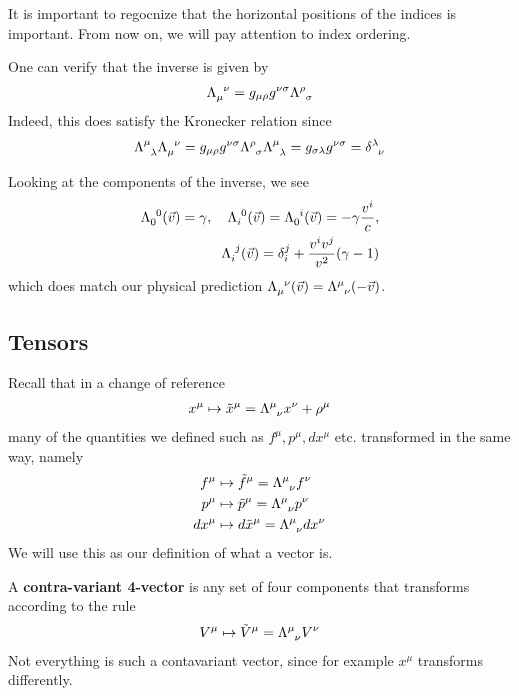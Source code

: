 It is important to regocnize that the horizontal positions of the indices is important.
From now on, we will pay attention to index ordering.

One can verify that the inverse is given by
\begin{align*}
  \tensor{\Lambda}{_{\mu}^{\nu}}
  = 
  g_{\mu \rho}g^{\nu \sigma} \tensor{\Lambda}{^{\rho}_{\sigma}}
\end{align*}
Indeed, this does satisfy the Kronecker relation since
\begin{align*}
  \tensor{\Lambda}{^{\mu}_{\lambda}}
  \tensor{\Lambda}{_{\mu}^{\nu}}
  = 
  g_{\mu \rho}g^{\nu \sigma} 
  \tensor{\Lambda}{^{\rho}_{\sigma}}
  \tensor{\Lambda}{^{\mu}_{\lambda}}
  = 
  g_{\sigma \lambda} g^{\nu \sigma} = 
  \tensor{\delta}{^{\lambda}_{\nu}}
\end{align*}

Looking at the components of the inverse, we see
\begin{align*}
  \tensor{\Lambda}{_0^0}
  (\vec{v}) = \gamma, 
  \quad
  \tensor{\Lambda}{_i^0}(\vec{v}) = \tensor{\Lambda}{_0^{i}}(\vec{v}) = - \gamma \frac{v^{i}}{c},\\
  \tensor{\Lambda}{_i^{j}}(\vec{v}) = \delta_i^{j} + \frac{v^{i}v^{j}}{v^{2}}(\gamma - 1)
\end{align*}
which does match our physical prediction $\tensor{\Lambda}{_{\mu}^{\nu}}(\vec{v}) = \tensor{\Lambda}{^\mu_\nu}(-\vec{v})$.


\subsection{Tensors}

Recall that in a change of reference
\begin{align*}
  x^{\mu} \mapsto \tilde{x}^{\mu} = \tensor{\Lambda}{^{\mu}_{\nu}} x^{\nu} + \rho^{\mu}
\end{align*}
many of the quantities we defined such as $f^{\mu},p^{\mu},dx^{\mu}$ etc. transformed in the same way, namely
\begin{align*}
  f^{\mu} &\mapsto  \tilde{f}^{\mu} = \tensor{\Lambda}{^{\mu}_{\nu}} f^{\nu}\\
  p^{\mu} &\mapsto  \tilde{p}^{\mu} = \tensor{\Lambda}{^{\mu}_{\nu}} p^{\nu}\\
  dx^{\mu} &\mapsto d \tilde{x}^{\mu} = \tensor{\Lambda}{^{\mu}_{\nu}} dx^{\nu}
\end{align*}
We will use this as our definition of what a vector is.

A \textbf{contra-variant 4-vector} is any set of four components that transforms according to the rule
\begin{align*}
  V^{\mu} \mapsto  \tilde{V}^{\mu} = \tensor{\Lambda}{^{\mu}_{\nu}} V^{\nu}
\end{align*}
Not everything is such a contavariant vector, since for example $x^{\mu}$ transforms differently.


